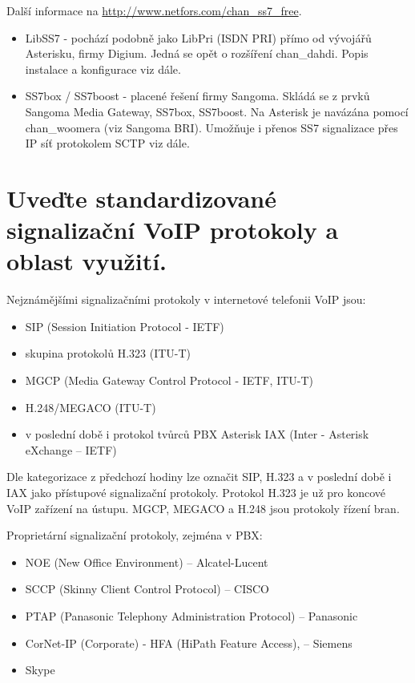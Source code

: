 Další informace na \href{http://www.netfors.com/chan_ss7_free}{http://www.netfors.com/chan\_ss7\_free}.

\begin{itemize}[noitemsep]
    \item LibSS7 - pochází podobně jako LibPri (ISDN PRI) přímo od vývojářů Asterisku, firmy Digium. Jedná se opět o rozšíření chan\_dahdi. Popis instalace a konfigurace viz dále.
    \item SS7box / SS7boost - placené řešení firmy Sangoma. Skládá se z prvků Sangoma Media Gateway, SS7box, SS7boost. Na Asterisk je navázána pomocí chan\_woomera (viz Sangoma BRI). Umožňuje i přenos SS7 signalizace přes IP síť protokolem SCTP viz dále.
\end{itemize}

\section{Uveďte standardizované signalizační VoIP protokoly a oblast využití.}

Nejznámějšími signalizačními protokoly v internetové telefonii VoIP jsou:
\begin{itemize}[noitemsep]
    \item SIP (Session Initiation Protocol - IETF)
    \item skupina protokolů H.323 (ITU-T)
    \item MGCP (Media Gateway Control Protocol - IETF, ITU-T)
    \item H.248/MEGACO (ITU-T)
    \item v poslední době i protokol tvůrců PBX Asterisk IAX (Inter - Asterisk eXchange -- IETF)
\end{itemize}
Dle kategorizace z předchozí hodiny lze označit SIP, H.323 a v poslední době i IAX jako přístupové signalizační protokoly. Protokol H.323 je už pro koncové VoIP zařízení na ústupu. MGCP, MEGACO a H.248 jsou protokoly řízení bran.

Proprietární signalizační protokoly, zejména v PBX:
\begin{itemize}[noitemsep]
    \item NOE (New Office Environment) -- Alcatel-Lucent
    \item SCCP (Skinny Client Control Protocol) -- CISCO
    \item PTAP (Panasonic Telephony Administration Protocol) -- Panasonic
    \item CorNet-IP (Corporate) - HFA (HiPath Feature Access), -- Siemens
    \item Skype
\end{itemize}

